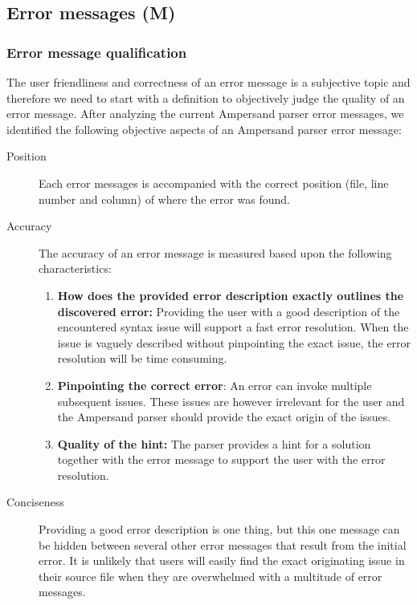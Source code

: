 
\subsection{Error messages (M)}

\subsubsection{Error message qualification}
The user friendliness and correctness of an error message is a subjective topic and therefore we need to start with a definition to objectively judge the quality of an error message.
After analyzing the current Ampersand parser error messages, we identified the following objective aspects of an Ampersand parser error message:
%
\begin{description}
	\item [Position]
	Each error messages is accompanied with the correct position (file, line number and column) of where the error was found.
	\item [Accuracy]
	The accuracy of an error message is measured based upon the following characteristics:
	\begin{enumerate}
		\item	\textbf{\small How does the provided error description exactly outlines the discovered error:}
				Providing the user with a good description of the encountered syntax issue will support a fast error resolution.
				When the issue is vaguely described without pinpointing the exact issue, the error resolution will be time consuming.
		\item	\textbf{\small Pinpointing the correct error}:
				An error can invoke multiple subsequent issues. 
				These issues are however irrelevant for the user and the Ampersand parser should provide the exact origin of the issues.
		\item	\textbf{\small Quality of the hint:}
			The parser provides a hint for a solution together with the error message to support the user with the error resolution.
	\end {enumerate}
    \item[Conciseness]
	Providing a good error description is one thing, but this one message can be hidden between several other error messages that result from the initial error.
	It is unlikely that users will easily find the exact originating issue in their source file when they are overwhelmed with a multitude of error messages. %
\end {description}
